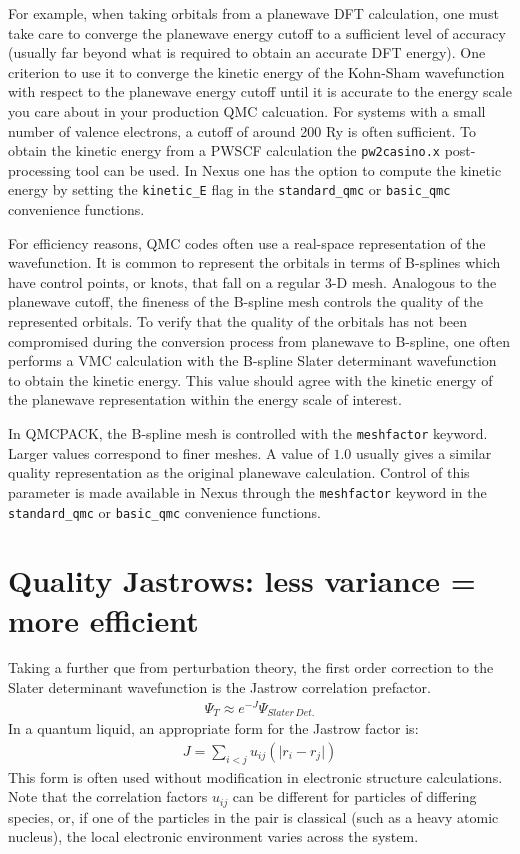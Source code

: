 \documentclass[oneside,11pt]{memoir}
\numberwithin{equation}{section}
\newcommand{\abs}[1]{\lvert #1 \rvert}
\begin{document}
For example, when taking orbitals from a planewave DFT calculation, one must 
take care to converge the planewave energy cutoff to a sufficient level of 
accuracy (usually far beyond what is required to obtain an accurate DFT 
energy).  One criterion to use it to converge the kinetic energy of the 
Kohn-Sham wavefunction with respect to the planewave energy cutoff until it 
is accurate to the energy scale you care about in your production QMC 
calcuation.  For systems with a small number of valence electrons, a cutoff of 
around 200 Ry is often sufficient.  To obtain the kinetic energy from a PWSCF 
calculation the \texttt{pw2casino.x} post-processing tool can be used.  In 
Nexus one has the option to compute the kinetic energy by setting 
the \texttt{kinetic\_E} flag in the \texttt{standard\_qmc} or 
\texttt{basic\_qmc} convenience functions. 

For efficiency reasons, QMC codes often use a real-space representation of the 
wavefunction.  It is common to represent the orbitals in terms of B-splines 
which have control points, or knots, that fall on a regular 3-D mesh.  
Analogous to the planewave cutoff, the fineness of the B-spline mesh controls 
the quality of the represented orbitals.  To verify that the quality of the 
orbitals has not been compromised during the conversion process from planewave 
to B-spline, one often performs a VMC calculation with the B-spline Slater 
determinant wavefunction to obtain the kinetic energy.  This value should agree 
with the kinetic energy of the planewave representation within the energy scale 
of interest.  

In QMCPACK, the B-spline mesh is controlled with the \texttt{meshfactor} 
keyword.  Larger values correspond to finer meshes.  A value of $1.0$ usually 
gives a similar quality representation as the original planewave calculation. 
Control of this parameter is made available in Nexus through the 
\texttt{meshfactor} keyword in the \texttt{standard\_qmc} or 
\texttt{basic\_qmc} convenience functions. 


\section{Quality Jastrows: less variance = more efficient}
Taking a further que from perturbation theory, the first order correction to 
the Slater determinant wavefunction is the Jastrow correlation prefactor.  
\begin{align}
  \Psi_T\approx e^{-J}\Psi_{Slater\, Det.}
\end{align}
In a quantum liquid, an appropriate form for the Jastrow factor is:
\begin{align}
  J = \sum_{i<j} u_{ij}(\abs{r_i-r_j})
\end{align}
This form is often used without modification in electronic structure 
calculations.  Note that the correlation factors $u_{ij}$ can be different for 
particles of differing species, or, if one of the particles in the pair is 
classical (such as a heavy atomic nucleus), the local electronic environment 
varies across the system.
\end{document}
